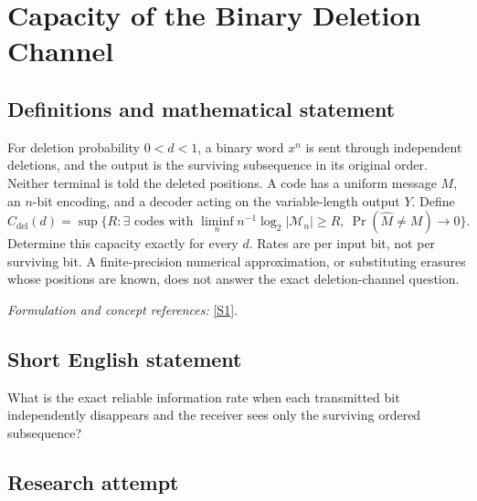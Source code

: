 \documentclass[11pt,a4paper]{article}
\newcommand{\sref}[2]{\hyperlink{source:#1:#2}{[S#2]}}
\newif\ifshowcatalogue
\newcommand{\cataloguescope}[1]{\ifshowcatalogue
 \paragraph{Exact scope in the supplied catalogue.}
 \begin{quote}\small #1\end{quote}\fi}
\numberwithin{equation}{section}
\begin{document}
\setcounter{section}{224}
\clearpage
\section{\texorpdfstring{Capacity of the Binary Deletion Channel}{Capacity of the Binary Deletion Channel}}\label{225}
\subsection{Definitions and mathematical statement}
For deletion probability $0<d<1$, a binary word $x^n$ is sent through independent deletions, and the output is the surviving subsequence in its original order. Neither terminal is told the deleted positions. A code has a uniform message $M$, an $n$-bit encoding, and a decoder acting on the variable-length output $Y$. Define
\[
 C_{\mathrm{del}}(d)=\sup\{R:\exists\text{ codes with }\liminf_n n^{-1}\log_2|\mathcal M_n|\ge R,
 \ \Pr(\widehat M\ne M)\to0\}.
\]
Determine this capacity exactly for every $d$. Rates are per input bit, not per surviving bit. A finite-precision numerical approximation, or substituting erasures whose positions are known, does not answer the exact deletion-channel question.
\par\smallskip\textit{Formulation and concept references:} \sref{225}{1}.
\cataloguescope{Determine the exact average-error Shannon capacity C\_del(d), in bits per input bit, of the binary deletion channel for every real d with 0<d<1. Each input bit is independently deleted with probability d; surviving bits retain their order, and neither terminal observes the deletion pattern.}
\subsection{Short English statement}
What is the exact reliable information rate when each transmitted bit independently disappears and the receiver sees only the surviving ordered subsequence?
\subsection{Research attempt}
\end{document}
